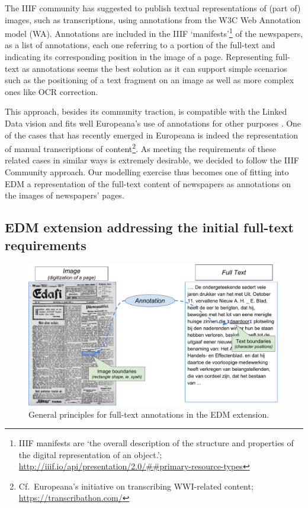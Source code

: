 \documentclass[a4paper,UKenglish,cleveref, autoref]{oasics-v2019}
\begin{document}
The IIIF community has suggested to publish textual representations of (part of) images, such as transcriptions, using annotations from the W3C Web Annotation model (WA). Annotations are included in the IIIF
`manifests'\footnote{IIIF manifests are `the overall description of the structure and properties of the digital representation of an object.'; \url{http://iiif.io/api/presentation/2.0/##primary-resource-types}}
of the newspapers, as a list of annotations, each one referring to a portion of the full-text and indicating its corresponding position in the image of a page. Representing full-text as annotations seems the best solution as it can support simple scenarios such as the positioning of a text fragment on an image as well as more complex ones like OCR correction.

This approach, besides its community traction, is compatible with the Linked Data vision and fits well Europeana's use of annotations for other purposes \cite{Gordea15}. One of the cases that has recently emerged in Europeana is indeed the representation of manual transcriptions of content\footnote{Cf.\, Europeana’s initiative on transcribing WWI-related content; \url{https://transcribathon.com/}}.
As meeting the requirements of these related cases in similar ways is extremely desirable, we decided to follow the IIIF Community approach. Our modelling exercise thus becomes one of fitting into EDM a representation of the full-text content of newspapers as annotations on the images of newspapers' pages. 

\subsection{EDM extension addressing the initial full-text requirements}
\label{sec:edmextension}

\begin{figure}
    \centering
    \includegraphics{Fig1}
    \caption{General principles for full-text annotations in the EDM extension.}\label{fig:generalprincipals}
\end{figure}
\end{document}
